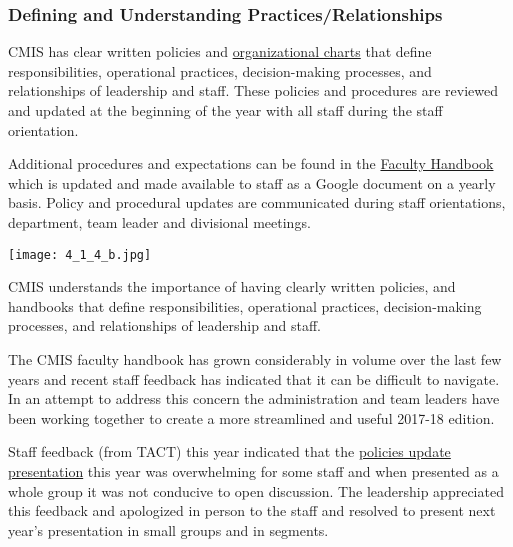 \subsubsection{Defining and Understanding Practices/Relationships}



\begin{findings}
CMIS has clear written policies and \href{https://drive.google.com/a/cmis.ac.th/file/d/0Bwny3HLdIIS7RF9veFk5UXB2Q2M/view?usp=sharing}{organizational charts} that define responsibilities, operational practices, decision-making processes, and relationships of leadership and staff. These policies and procedures are reviewed and updated at the beginning of the year with all staff during the staff orientation.

Additional procedures and expectations can be found in the \href{https://docs.google.com/a/cmis.ac.th/document/d/1DrXVXsgw4U62HCGOceOKsgC8V1LDQFhHKgDB35oq4wY/edit?usp=sharing}{Faculty Handbook} which is updated and made available to staff as a Google document on a yearly basis. Policy and procedural updates are communicated during staff orientations, department, team leader and divisional meetings.

\texttt{[image: 4\_1\_4\_b.jpg]}


CMIS understands the importance of having clearly written policies, and handbooks that define responsibilities, operational practices, decision-making processes, and relationships of leadership and staff. 

The CMIS faculty handbook has grown considerably in volume over the last few years and recent staff feedback has indicated that it can be difficult to navigate. In an attempt to address this concern the administration and team leaders have been working together to create a more streamlined and useful  2017-18 edition. 

Staff feedback (from TACT) this year indicated that the \href{https://docs.google.com/a/cmis.ac.th/presentation/d/18ekiAcUSiwa7oJM9tdwe2OSfnC_47RkbLz8ZjEt6O9I/edit?usp=sharing}{policies update presentation} this year was overwhelming for some staff and when presented as a whole group it was not conducive to open discussion. The leadership appreciated this feedback and apologized in person to the staff and resolved to present next year's presentation in small groups and in segments. 
\end{findings}

